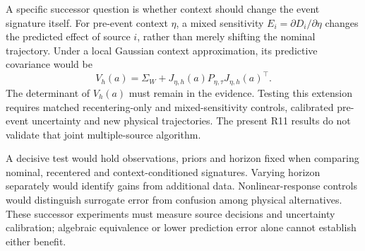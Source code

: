 A specific successor question is whether context should change the event
signature itself. For pre-event context $\eta$, a mixed sensitivity
$E_i=\partial D_i/\partial\eta$ changes the predicted effect of source $i$,
rather than merely shifting the nominal trajectory. Under a local Gaussian
context approximation, its predictive covariance would be
\begin{equation}
 V_h(a)=\Sigma_W+J_{\eta,h}(a)P_{\eta,\tau}J_{\eta,h}(a)^\top.
 \label{eq:context-conditioned-extension}
\end{equation}
The determinant of $V_h(a)$ must remain in the evidence. Testing this
extension requires matched recentering-only and mixed-sensitivity controls,
calibrated pre-event uncertainty and new physical trajectories. The present
R11 results do not validate that joint multiple-source algorithm.

A decisive test would hold observations, priors and horizon fixed when
comparing nominal, recentered and context-conditioned signatures. Varying
horizon separately would identify gains from additional data.
Nonlinear-response controls would distinguish surrogate error from
confusion among physical alternatives. These successor experiments must
measure source decisions and uncertainty calibration; algebraic
equivalence or lower prediction error alone cannot establish either benefit.
